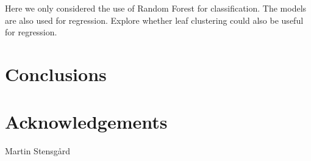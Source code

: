 \documentclass{article}
\begin{document}
Here we only considered the use of Random Forest for classification.
The models are also used for regression.
Explore whether leaf clustering could also be useful for regression.


\section{Conclusions}


\section*{Acknowledgements}
\noindent

Martin Stensgård

\newpage

 
\end{document}
